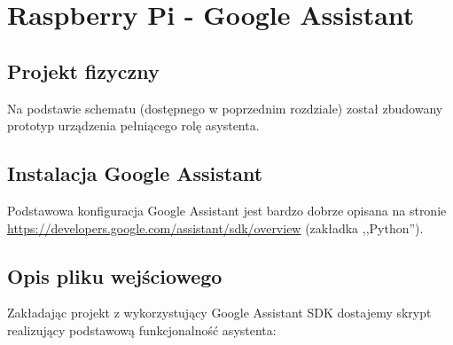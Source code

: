\section{Raspberry Pi - Google Assistant}

\subsection{Projekt fizyczny}

Na podstawie schematu (dostępnego w poprzednim rozdziale) został zbudowany prototyp urządzenia pełniącego rolę asystenta.

\begin{center}
\end{center}
	
\begin{center}
\end{center}

\subsection{Instalacja Google Assistant}

Podstawowa konfiguracja Google Assistant jest bardzo dobrze opisana na stronie \url{https://developers.google.com/assistant/sdk/overview} (zakładka ,,Python'').

\subsection{Opis pliku wejściowego}

Zakładając projekt z wykorzystujący Google Assistant SDK dostajemy skrypt realizujący podstawową funkcjonalność asystenta:



